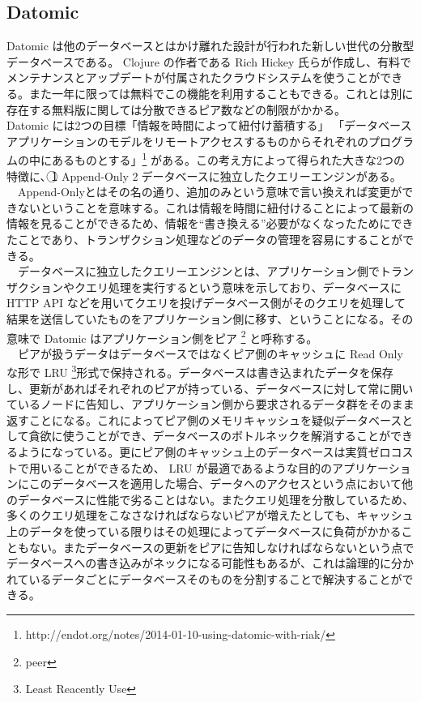 \documentclass[dvipdfmx]{scrartcl}
\begin{document}
\subsection{Datomic}
\label{sec:org4351178}
 Datomic は他のデータベースとはかけ離れた設計が行われた新しい世代の分散型データベースである。 Clojure の作者である Rich Hickey 氏らが作成し、有料でメンテナンスとアップデートが付属されたクラウドシステムを使うことができる。また一年に限っては無料でこの機能を利用することもできる。これとは別に存在する無料版に関しては分散できるピア数などの制限がかかる。\\
  Datomic には2つの目標「情報を時間によって紐付け蓄積する」 「データベースアプリケーションのモデルをリモートアクセスするものからそれぞれのプログラムの中にあるものとする」\footnote{http://endot.org/notes/2014-01-10-using-datomic-with-riak/} がある。この考え方によって得られた大きな2つの特徴に、\textcircled{\scriptsize 1} Append-Only \textcircled{\scriptsize 2}データベースに独立したクエリーエンジンがある。\\
　Append-Onlyとはその名の通り、追加のみという意味で言い換えれば変更ができないということを意味する。これは情報を時間に紐付けることによって最新の情報を見ることができるため、情報を``書き換える''必要がなくなったためにできたことであり、トランザクション処理などのデータの管理を容易にすることができる。\\
　データベースに独立したクエリーエンジンとは、アプリケーション側でトランザクションやクエリ処理を実行するという意味を示しており、データベースに HTTP API などを用いてクエリを投げデータベース側がそのクエリを処理して結果を送信していたものをアプリケーション側に移す、ということになる。その意味で Datomic はアプリケーション側をピア \footnote{peer} と呼称する。\\
　ピアが扱うデータはデータベースではなくピア側のキャッシュに Read Only な形で LRU \footnote{Least Reacently Use}形式で保持される。データベースは書き込まれたデータを保存し、更新があればそれぞれのピアが持っている、データベースに対して常に開いているノードに告知し、アプリケーション側から要求されるデータ群をそのまま返すことになる。これによってピア側のメモリキャッシュを疑似データベースとして貪欲に使うことができ、データベースのボトルネックを解消することができるようになっている。更にピア側のキャッシュ上のデータベースは実質ゼロコストで用いることができるため、 LRU が最適であるような目的のアプリケーションにこのデータベースを適用した場合、データへのアクセスという点において他のデータベースに性能で劣ることはない。またクエリ処理を分散しているため、多くのクエリ処理をこなさなければならないピアが増えたとしても、キャッシュ上のデータを使っている限りはその処理によってデータベースに負荷がかかることもない。またデータベースの更新をピアに告知しなければならないという点でデータベースへの書き込みがネックになる可能性もあるが、これは論理的に分かれているデータごとにデータベースそのものを分割することで解決することができる。\\
\end{document}
